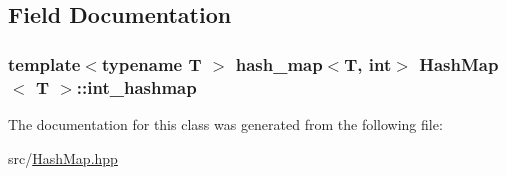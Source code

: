 \subsection{\-Field \-Documentation}
\hypertarget{classHashMap_a2b6bacf8f358c4ffab078168b7b9eb63}{
\subsubsection[{int\-\_\-hashmap}]{\setlength{\rightskip}{0pt plus 5cm}template$<$typename T $>$ hash\-\_\-map$<$\-T, int$>$ {\bf \-Hash\-Map}$<$ \-T $>$\-::{\bf int\-\_\-hashmap}}}\label{classHashMap_a2b6bacf8f358c4ffab078168b7b9eb63}


\-The documentation for this class was generated from the following file\-:\begin{DoxyCompactItemize}
\item 
src/\hyperlink{HashMap_8hpp}{\-Hash\-Map.\-hpp}\end{DoxyCompactItemize}
